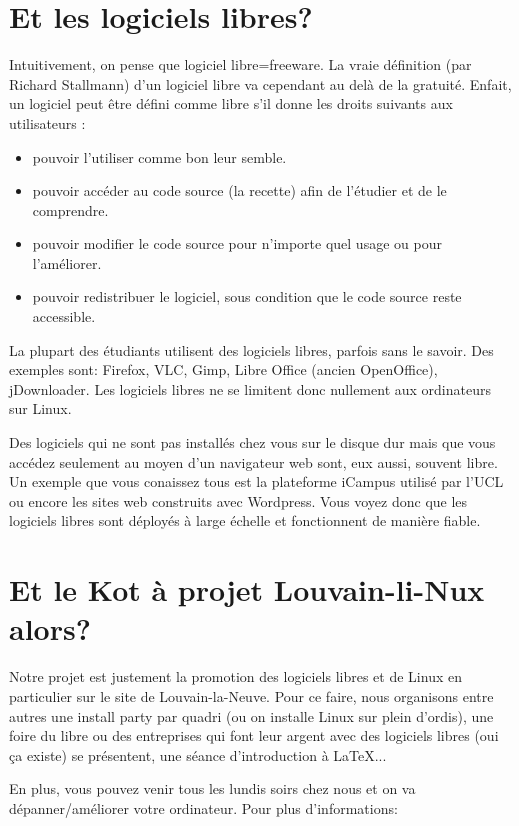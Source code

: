 \section*{Et les logiciels libres?}
Intuitivement, on pense que logiciel libre=freeware.
La vraie définition (par Richard Stallmann) d'un logiciel libre va cependant au delà de la gratuité.
Enfait, un logiciel peut être défini comme libre s'il donne les droits suivants aux utilisateurs :

\begin{itemize}
\item pouvoir l’utiliser comme bon leur semble.
\item pouvoir accéder au code source (la recette) afin de l’étudier et de le comprendre.
\item pouvoir modifier le code source pour n’importe quel usage ou pour l’améliorer.
\item pouvoir redistribuer le logiciel, sous condition que le code source reste accessible.
\end{itemize}

La plupart des étudiants utilisent des logiciels libres, parfois sans le savoir.
Des exemples sont: Firefox, VLC, Gimp, Libre Office (ancien OpenOffice), jDownloader.
Les logiciels libres ne se limitent donc nullement aux ordinateurs sur Linux.

Des logiciels qui ne sont pas installés chez vous sur le disque dur mais
que vous accédez seulement au moyen d'un navigateur web sont, eux aussi, souvent libre.
Un exemple que vous conaissez tous est la plateforme iCampus utilisé par l'UCL
ou encore les sites web construits avec Wordpress. Vous voyez donc que les logiciels 
libres sont déployés à large échelle et fonctionnent de manière fiable.

\section*{Et le Kot à projet Louvain-li-Nux alors?}
Notre projet est justement la promotion des logiciels libres et de Linux en particulier sur le site de Louvain-la-Neuve.
Pour ce faire, nous organisons entre autres une install party par quadri (ou on installe Linux sur plein d'ordis),
une foire du libre ou des entreprises qui font leur argent avec des logiciels libres (oui ça existe) se présentent,
une séance d'introduction à \LaTeX{}...

En plus, vous pouvez venir tous les lundis soirs chez nous et on va dépanner/améliorer votre ordinateur.
Pour plus d'informations:
                                                                                                                       

	